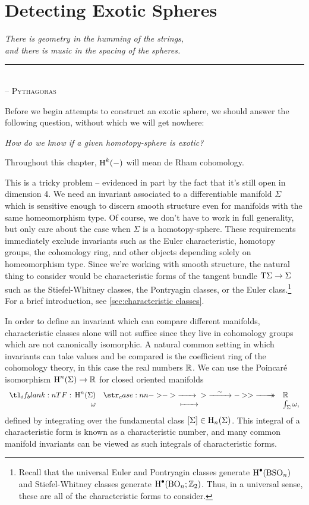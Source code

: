 \chapter{Detecting Exotic Spheres}

\begin{flushleft}
	\textsl{There is geometry in the humming of the strings,}\\
	\textsl{and there is music in the spacing of the spheres.}\\
	\rule[0pt]{21em}{0.5pt}\\
	-- \textsc{Pythagoras}\\
	\vspace{2em}
\end{flushleft}

Before we begin attempts to construct an exotic sphere, we should answer the following question, without which we will get nowhere:
\begin{center}
  \textsl{How do we know if a given homotopy-sphere is exotic?}
\end{center}
Throughout this chapter, $\operatorname{H}^k(-)$ will mean de Rham cohomology.

This is a tricky problem -- evidenced in part by the fact that it's still open in dimension 4. We need an invariant associated to a differentiable manifold $\Sigma$ which is sensitive enough to discern smooth structure even for manifolds with the same homeomorphism type. Of course, we don't have to work in full generality, but only care about the case when $\Sigma$ is a homotopy-sphere. These requirements immediately exclude invariants such as the Euler characteristic, homotopy groups, the cohomology ring, and other objects depending solely on homeomorphism type. Since we're working with smooth structure, the natural thing to consider would be characteristic forms of the tangent bundle $\mathrm{T} \Sigma \to \Sigma$ such as the Stiefel-Whitney classes, the Pontryagin classes, or the Euler class.\footnote{Recall that the universal Euler and Pontryagin classes generate $\operatorname{H}^\bullet({\operatorname{BSO}}_n)$ and Stiefel-Whitney classes generate $\operatorname{H}^\bullet({\operatorname{BO}}_n; \mathbb{Z}_2)$. Thus, in a universal sense, these are all of the characteristic forms to consider.} For a brief introduction, see \cref{sec:characteristic classes}.

In order to define an invariant which can compare different manifolds, characteristic classes alone will not suffice since they live in cohomology groups which are not canonically isomorphic. A natural common setting in which invariants can take values and be compared is the coefficient ring of the cohomology theory, in this case the real numbers $\mathbb{R}$.
We can use the Poincar\'e isomorphism $\operatorname{H}^n(\Sigma) \to \mathbb{R}$ for closed oriented manifolds
\[
    \lkxfunc{}{\H^n(\Sigma)}{\R}{\omega}{\int_\Sigma \omega,}
\]
defined by integrating over the fundamental class $[\Sigma]\in \operatorname{H}_n(\Sigma)$. This integral of a characteristic form is known as a characteristic number, and many common manifold invariants can be viewed as such integrals of characteristic forms.

